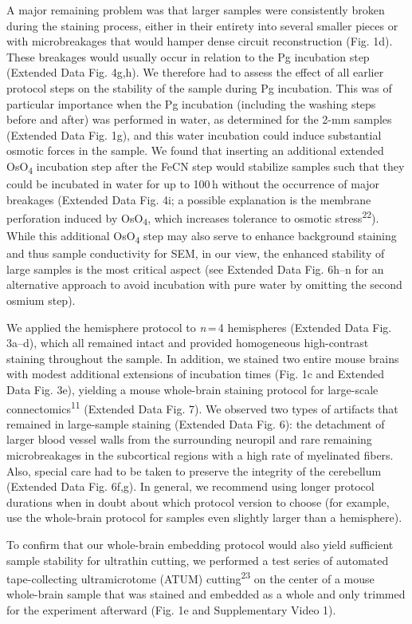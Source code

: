 \documentclass{article}
\begin{document}
A major remaining problem was that larger samples were consistently broken during the staining process, either in their entirety into several smaller pieces or with microbreakages that would hamper dense circuit reconstruction (Fig. 1d). These breakages would usually occur in relation to the Pg incubation step (Extended Data Fig. 4g,h). We therefore had to assess the effect of all earlier protocol steps on the stability of the sample during Pg incubation. This was of particular importance when the Pg incubation (including the washing steps before and after) was performed in water, as determined for the 2-mm samples (Extended Data Fig. 1g), and this water incubation could induce substantial osmotic forces in the sample. We found that inserting an additional extended OsO\textsubscript{4} incubation step after the FeCN step would stabilize samples such that they could be incubated in water for up to 100\,h without the occurrence of major breakages (Extended Data Fig. 4i; a possible explanation is the membrane perforation induced by OsO\textsubscript{4}, which increases tolerance to osmotic stress\textsuperscript{22}). While this additional OsO\textsubscript{4} step may also serve to enhance background staining and thus sample conductivity for SEM, in our view, the enhanced stability of large samples is the most critical aspect (see Extended Data Fig. 6h–n for an alternative approach to avoid incubation with pure water by omitting the second osmium step).

We applied the hemisphere protocol to \emph{n}\,=\,4 hemispheres (Extended Data Fig. 3a–d), which all remained intact and provided homogeneous high-contrast staining throughout the sample. In addition, we stained two entire mouse brains with modest additional extensions of incubation times (Fig. 1c and Extended Data Fig. 3e), yielding a mouse whole-brain staining protocol for large-scale connectomics\textsuperscript{11} (Extended Data Fig. 7). We observed two types of artifacts that remained in large-sample staining (Extended Data Fig. 6): the detachment of larger blood vessel walls from the surrounding neuropil and rare remaining microbreakages in the subcortical regions with a high rate of myelinated fibers. Also, special care had to be taken to preserve the integrity of the cerebellum (Extended Data Fig. 6f,g). In general, we recommend using longer protocol durations when in doubt about which protocol version to choose (for example, use the whole-brain protocol for samples even slightly larger than a hemisphere).

To confirm that our whole-brain embedding protocol would also yield sufficient sample stability for ultrathin cutting, we performed a test series of automated tape-collecting ultramicrotome (ATUM) cutting\textsuperscript{23} on the center of a mouse whole-brain sample that was stained and embedded as a whole and only trimmed for the experiment afterward (Fig. 1e and Supplementary Video 1).
\end{document}
